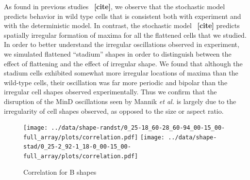 \documentclass[letterpaper,twocolumn,amsmath,amssymb,pre]{revtex4-1}
\newcommand{\red}[1]{{\bf \color{red} #1}}
\newcommand{\fixme}[1]{\red{[#1]}}
\begin{document}
As found in previous studies~\fixme{cite}, we observe that the
stochastic model predicts behavior in wild type cells that is
consistent both with experiment and with the deterministic model.  In
contrast, the stochastic model~\fixme{cite} predicts spatially
irregular formation of maxima for all the flattened cells that we
studied.  In order to better understand the irregular oscillations
observed in experiment, we simulated flattened ``stadium'' shapes in
order to distinguish between the effect of flattening and the effect
of irregular shape.  We found that although the stadium cells
exhibited somewhat more irregular locations of maxima than the
wild-type cells, their oscillation was far more periodic and bipolar
than the irregular cell shapes observed experimentally.  Thus we
confirm that the disruption of the MinD oscillations seen by Mannik
\emph{et al.} is largely due to the irregularity of cell shapes
observed, as opposed to the size or aspect ratio.



\begin{figure}
  \texttt{[image: ../data/shape-randst/0\_25-18\_60-28\_60-94\_00-15\_00-full\_array/plots/correlation.pdf]}
  \texttt{[image: ../data/shape-stad/0\_25-2\_92-1\_18-0\_00-15\_00-full\_array/plots/correlation.pdf]}
  \caption{Correlation for B shapes}
  \label{corr-B}
\end{figure}
\end{document}

